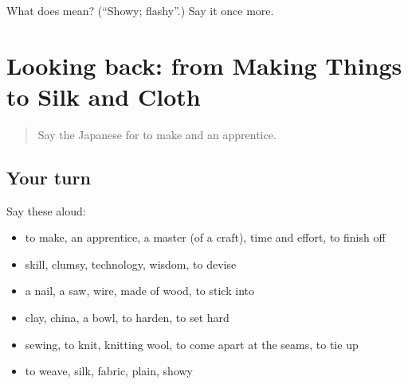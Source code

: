 \begin{tcolorbox}[breakable,colback=teal!4,colframe=teal!35!black,title={Before you move on}]
What does  mean? (\textquotedblleft{}Showy; flashy\textquotedblright{}.) Say it once more.
\end{tcolorbox}
\section[(dialogue)]{Looking back: from Making Things to Silk and Cloth}

\label{lesson:JA-R485-review-480-485}



\begin{quote}
Say the Japanese for to make and an apprentice.
\end{quote}

\subsection*{Your turn}
Say these aloud:

\begin{itemize}
\raggedright
  \item to make, an apprentice, a master (of a craft), time and effort, to finish off
  \item skill, clumsy, technology, wisdom, to devise
  \item a nail, a saw, wire, made of wood, to stick into
  \item clay, china, a bowl, to harden, to set hard
  \item sewing, to knit, knitting wool, to come apart at the seams, to tie up
  \item to weave, silk, fabric, plain, showy
\end{itemize}

